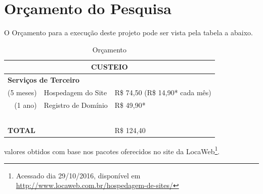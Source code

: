 \documentclass[
	12pt,				%
	openany,
	oneside,
	a4paper,			%
	english,			%
	brazil,				%
	]{abntex2}
\begin{document}





\chapter{Orçamento do Pesquisa}

O Orçamento para a execução deste projeto pode ser vista pela tabela a abaixo.
\begin{table}[H]
  \caption{Orçamento}
  \centering
  \begin{tabular}{|r l|l|}
    \hline 
    \multicolumn{3}{|c|}{\textsc{CUSTEIO}} \\ 
    \hline 
    \multicolumn{3}{|l|}{\textbf{Serviços de Terceiro}} \\ 
    \hline 
    (5 meses) & Hospedagem do Site & R\$ 74,50 (R\$ 14,90* cada mês) \\ 
    \hline 
    (1 ano) & Registro de Domínio & R\$ 49,90*   \\ 
    \hline 
    \multicolumn{3}{|c|}{~} \\ 
    \hline 
    \multicolumn{2}{|l|}{\textbf{TOTAL}} & R\$ 124,40\\ 
    \hline 
  \end{tabular} 
  \label{tab:orcamento}
\end{table}

\noindent * valores obtidos com base nos pacotes oferecidos no site da LocaWeb\footnote{Acessado dia 29/10/2016, disponível em \url{http://www.locaweb.com.br/hospedagem-de-sites/}}.






%
%
\end{document}
